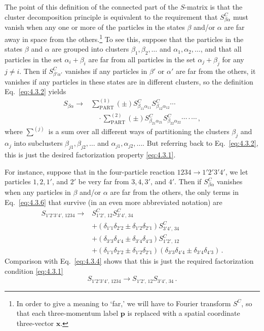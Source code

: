 The point of this definition of the connected part of the $S$-matrix is
that the cluster decomposition principle is equivalent to the requirement
that $S^C_{\beta\alpha}$ must vanish when any one or more of the particles in
the states $\beta$ and/or $\alpha$ are far away in space from the
others.\footnote{In order to give a meaning to `far,' we will have to Fourier
transform $S^C$, so that each three-momentum label $\mathbf p$ is replaced with
a spatial coordinate three-vector $\mathbf x$.} To see this, suppose that the
particles in the states $\beta$ and $\alpha$ are grouped into clusters
$\beta_1,\beta_2,\ldots$ and $\alpha_1,\alpha_2,\ldots$, and that all particles
in the set $\alpha_i+\beta_i$ are far from all particles in the set
$\alpha_j+\beta_j$ for any $j\ne i$. Then if $S^C_{\beta'\alpha'}$ vanishes if
any particles in $\beta'$ or $\alpha'$ are far from the others, it vanishes if
any particles in these states are in different clusters, so the definition
Eq.~\eqref{eq:4.3.2} yields
\begin{equation}
\begin{aligned}
S_{\beta\alpha}\longrightarrow{}&
\sum_{\mathrm{PART}}^{(1)}(\pm)
S^C_{\beta_{11}\alpha_{11}}S^C_{\beta_{12}\alpha_{12}}\cdots \\
&\quad\cdot
\sum_{\mathrm{PART}}^{(2)}(\pm)
S^C_{\beta_{21}\alpha_{21}}S^C_{\beta_{22}\alpha_{22}}\cdots
\cdot\cdots\,,
\end{aligned}
\tag{4.3.7}
\label{eq:4.3.7}
\end{equation}
where $\sum^{(j)}$ is a sum over all different ways of partitioning the
clusters $\beta_j$ and $\alpha_j$ into subclusters
$\beta_{j1},\beta_{j2},\ldots$ and $\alpha_{j1},\alpha_{j2},\ldots$. But
referring back to Eq.~\eqref{eq:4.3.2}, this is just the desired factorization property
\eqref{eq:4.3.1}.

For instance, suppose that in the four-particle reaction
$1234\to1'2'3'4'$, we let particles $1,2,1'$, and $2'$ be very far from
$3,4,3'$, and $4'$. Then if $S^C_{\beta\alpha}$ vanishes when any particles
in $\beta$ and/or $\alpha$ are far from the others, the only terms in
Eq.~\eqref{eq:4.3.6} that survive (in an even more abbreviated notation) are
\[
\begin{aligned}
S_{1'2'3'4',\,1234}\longrightarrow{}&
S^C_{1'2',\,12}S^C_{3'4',\,34} \\
&+(\delta_{1'1}\delta_{2'2}\mathbin{\pm}
    \delta_{1'2}\delta_{2'1})S^C_{3'4',\,34} \\
&+(\delta_{3'3}\delta_{4'4}\mathbin{\pm}
    \delta_{3'4}\delta_{4'3})S^C_{1'2',\,12} \\
&+(\delta_{1'1}\delta_{2'2}\mathbin{\pm}
    \delta_{1'2}\delta_{2'1})
  (\delta_{3'3}\delta_{4'4}\mathbin{\pm}
    \delta_{3'4}\delta_{4'3})\,.
\end{aligned}
\]
Comparison with Eq.~\eqref{eq:4.3.4} shows that this is just the required
factorization condition \eqref{eq:4.3.1}
\[
S_{1'2'3'4',\,1234}\longrightarrow
S_{1'2',\,12}S_{3'4',\,34}\,.
\]

